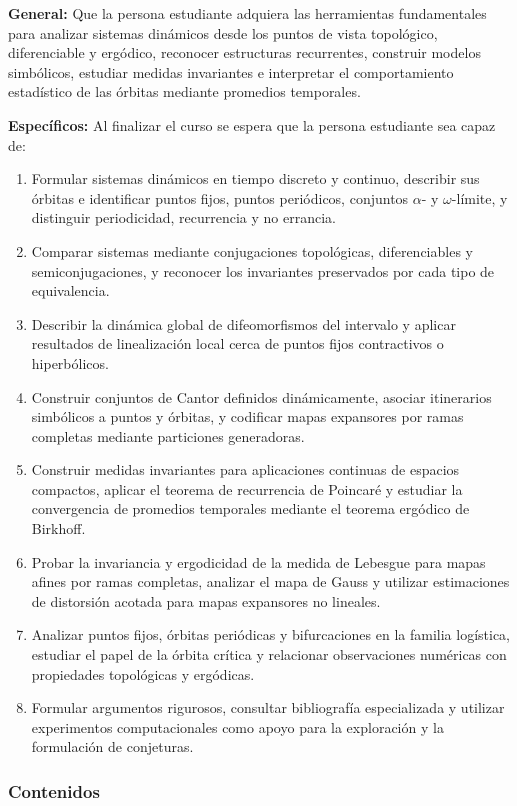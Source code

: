 \begin{refsection}
\textbf{General:} Que la persona estudiante adquiera las herramientas fundamentales para analizar sistemas dinámicos desde los puntos de vista topológico, diferenciable y ergódico, reconocer estructuras recurrentes, construir modelos simbólicos, estudiar medidas invariantes e interpretar el comportamiento estadístico de las órbitas mediante promedios temporales.

\textbf{Específicos:} Al finalizar el curso se espera que la persona estudiante sea capaz de:

\begin{enumerate}
\item Formular sistemas dinámicos en tiempo discreto y continuo, describir sus órbitas e identificar puntos fijos, puntos periódicos, conjuntos $\alpha$- y $\omega$-límite, y distinguir periodicidad, recurrencia y no errancia.
\item Comparar sistemas mediante conjugaciones topológicas, diferenciables y semiconjugaciones, y reconocer los invariantes preservados por cada tipo de equivalencia.
\item Describir la dinámica global de difeomorfismos del intervalo y aplicar resultados de linealización local cerca de puntos fijos contractivos o hiperbólicos.
\item Construir conjuntos de Cantor definidos dinámicamente, asociar itinerarios simbólicos a puntos y órbitas, y codificar mapas expansores por ramas completas mediante particiones generadoras.
\item Construir medidas invariantes para aplicaciones continuas de espacios compactos, aplicar el teorema de recurrencia de Poincaré y estudiar la convergencia de promedios temporales mediante el teorema ergódico de Birkhoff.
\item Probar la invariancia y ergodicidad de la medida de Lebesgue para mapas afines por ramas completas, analizar el mapa de Gauss y utilizar estimaciones de distorsión acotada para mapas expansores no lineales.
\item Analizar puntos fijos, órbitas periódicas y bifurcaciones en la familia logística, estudiar el papel de la órbita crítica y relacionar observaciones numéricas con propiedades topológicas y ergódicas.
\item Formular argumentos rigurosos, consultar bibliografía especializada y utilizar experimentos computacionales como apoyo para la exploración y la formulación de conjeturas.
\end{enumerate}

\subsubsection*{Contenidos}


\end{refsection}
